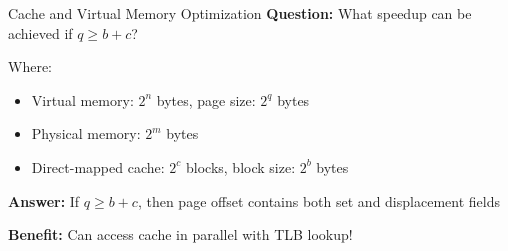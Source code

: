 \documentclass[aspectratio=169,12pt]{beamer}
\begin{document}
\begin{frame}{Cache and Virtual Memory Optimization}
\textbf{Question:} What speedup can be achieved if $q \geq b + c$?

Where:
\begin{itemize}
\item Virtual memory: $2^n$ bytes, page size: $2^q$ bytes
\item Physical memory: $2^m$ bytes
\item Direct-mapped cache: $2^c$ blocks, block size: $2^b$ bytes
\end{itemize}

\textbf{Answer:} If $q \geq b + c$, then page offset contains both set and displacement fields

\begin{center}
\end{center}

\textbf{Benefit:} Can access cache in parallel with TLB lookup!
\end{frame}
\end{document}

